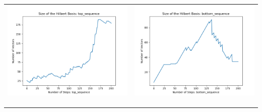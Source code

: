 \documentclass[10pt]{article}
\begin{document}
\begin{tabular}{c|c}
\begin{minipage}{.4\textwidth}
\includegraphics[width=\textwidth]{"DATA/5d/5 generators 2 bound F/top_sequence SIZE"}
\end{minipage} &
\begin{minipage}{.4\textwidth}
\includegraphics[width=\textwidth]{"DATA/5d/5 generators 2 bound F bottomup/bottom_sequence SIZE"}
\end{minipage} \\ \\
\hline \\\begin{minipage}{.4\textwidth}

\end{minipage}
\end{tabular}
\end{document}
